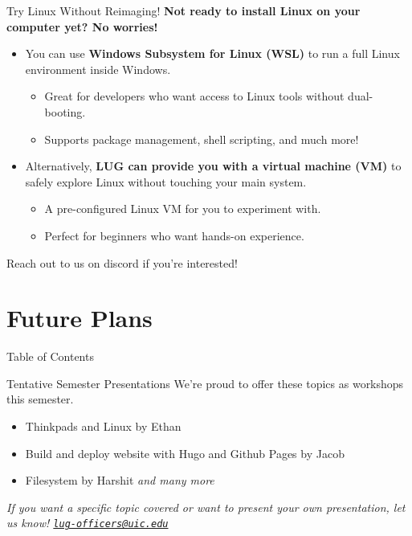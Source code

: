 \documentclass{beamer}
\begin{document}
\begin{frame}{Try Linux Without Reimaging!}
	\textbf{Not ready to install Linux on your computer yet? No worries!}
	\pause
	\begin{itemize}
		\item You can use \textbf{Windows Subsystem for Linux (WSL)} to run a full Linux environment inside Windows.
			\begin{itemize}
				\item Great for developers who want access to Linux tools without dual-booting.
				\item Supports package management, shell scripting, and much more!
			\end{itemize}
		\pause
		\item Alternatively, \textbf{LUG can provide you with a virtual machine (VM)} to safely explore Linux without touching your main system.
			\begin{itemize}
				\item A pre-configured Linux VM for you to experiment with.
				\item Perfect for beginners who want hands-on experience.
			\end{itemize}
		\pause
	\end{itemize}
	Reach out to us on discord if you're interested!
\end{frame}


\section{Future Plans}
\begin{frame}{Table of Contents}
	\tableofcontents[currentsection]
\end{frame}

\begin{frame}{Tentative Semester Presentations}
	We're proud to offer these topics as workshops this semester.
	\pause
	\begin{itemize}
		\item Thinkpads and Linux by Ethan
		\item Build and deploy website with Hugo and Github Pages by Jacob
		\item Filesystem by Harshit
        \textit{and many more}
	\end{itemize}
	\pause
	\textit{If you want a specific topic covered or want to present your
		own presentation, let us know!
		\href{mailto:lug-officers@uic.edu}{\texttt{lug-officers@uic.edu}}}
\end{frame}
\end{document}
